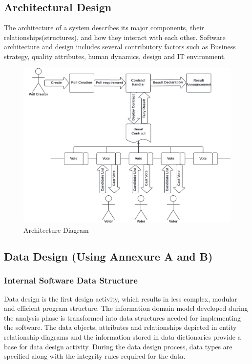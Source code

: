 \documentclass[oneside, 12pt]{book}
\begin{document}
		\subsection{Architectural Design}
			The architecture of a system describes its major components, their relationships(structures), and how they interact with each other. Software architecture and design includes several contributory factors such as Business strategy, quality attributes, human dynamics, design and IT environment.
			\begin{figure}[H]
				\centering
				\includegraphics[width=\linewidth]{./Resources/architecture.png}
			    \caption{Architecture Diagram}
			    \label{fig:architecture}
			\end{figure}
		\subsection{Data Design (Using Annexure A and B)}
			\subsubsection{Internal Software Data Structure}
				Data design is the first design activity, which results in less complex, modular and efficient program structure. The information domain model developed during the analysis phase is transformed into data structures needed for implementing the software. The data objects, attributes and relationships depicted in entity relationship diagrams and the information stored in data dictionaries provide a base for data design activity. During the data design process, data types are specified along with the integrity rules required for the data.
\end{document}
